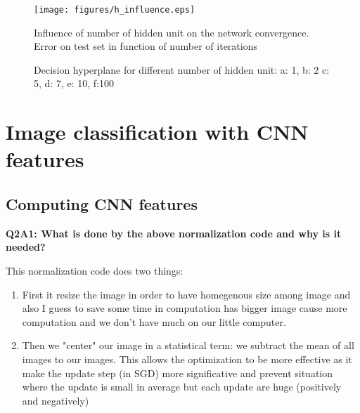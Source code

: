 \documentclass[a4paper,11pt]{exam}
\begin{document}
\begin{figure}[!h]
\centering
\texttt{[image: figures/h\_influence.eps]}
\caption{Influence of number of hidden unit on the network convergence. Error on test set in function of number of iterations}    
\label{h_influence}
\end{figure}


\begin{figure}[!h]%
    \centering
    \qquad
    \qquad
    \qquad
    \qquad
    \qquad
    \qquad
    \caption{Decision hyperplane for different number of hidden unit: a: 1, b: 2 c: 5, d: 7, e: 10, f:100}%
    \label{h_hyo}%
\end{figure}

\clearpage

\section{Image classification with CNN features}

\subsection{Computing CNN features}

\textbf{Q2A1: What is done by the above normalization code and why is it needed?\\}

This normalization code does two things:
\begin{enumerate}
\item First it resize the image in order to have homegenous size among image and also I guess to save some time in computation has bigger image cause more computation and we don't have much on our little computer.
\item Then we "center" our image in a statistical term: we subtract the mean of all images to our images. This allows the optimization to be more effective as it make the update step (in SGD) more significative and prevent situation where the update is small in average  but each update are huge (positively and negatively)
\end{enumerate}
\end{document}
